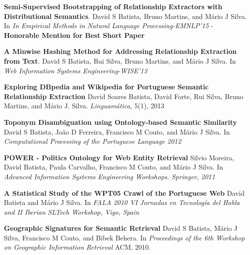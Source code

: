
\vspace{-5.5mm}

\begin{cventries}

  \cventry
    {} %
    {} %
    {} %
    {} %
    {
      \begin{cvitems} %
        \item {{\bf Semi-Supervised Bootstrapping of Relationship Extractors with Distributional Semantics}. David S Batista, Bruno Martins, and Mário J Silva. In {\it In Empirical Methods in Natural Language Processing-EMNLP'15} - {\bf Honorable Mention for Best Short Paper}}
		\vspace{2.0mm}
		\item {{\bf A Minwise Hashing Method for Addressing Relationship Extraction from Text}. David S Batista, Rui Silva, Bruno Martins, and Mário J Silva. In {\it Web Information Systems Engineering-WISE'13}}
		\vspace{2.0mm}
		\item {{\bf Exploring DBpedia and Wikipedia for Portuguese Semantic Relationship Extraction} David Soares Batista, David Forte, Rui Silva, Bruno Martins, and Mário J. Silva. {\it Linguamática,} 5(1), 2013}
		\vspace{2.0mm}
		\item {{\bf Toponym Disambiguation using Ontology-based Semantic Similarity} David S Batista, João D Ferreira, Francisco M Couto, and Mário J Silva. In {\it Computational Processing of the Portuguese Language 2012}}
		\vspace{2.0mm}
		\item {{\bf POWER - Politics Ontology for Web Entity Retrieval} Silvio Moreira, David Batista, Paula Carvalho, Francisco M Couto, and Mário J Silva. In {\it Advanced Information Systems Engineering Workshops. Springer, 2011}}
		\vspace{2.0mm}
		\item {{\bf A Statistical Study of the WPT05 Crawl of the Portuguese Web} David Batista and Mário J Silva. In {\it FALA 2010 VI Jornadas en Tecnología del Habla and II Iberian SLTech Workshop, Vigo, Spain}}
		\vspace{2.0mm}
		\item {{\bf Geographic Signatures for Semantic Retrieval} David S Batista, Mário J Silva, Francisco M Couto, and Bibek Behera. In {\it Proceedings of the 6th Workshop on Geographic Information Retrieval} ACM, 2010.}		
      \end{cvitems}
    }
\end{cventries}



\begin{comment}
\begin{cventries}

\cventry
    {X} %
    {X} %
    {X} %
    {X} %
	{
		\begin{cvitems}

			\item {\textbf{}. . \textit{}. - \textbf{}}






	\end{cvitems}
	}
\end{cventries}
\end{comment}